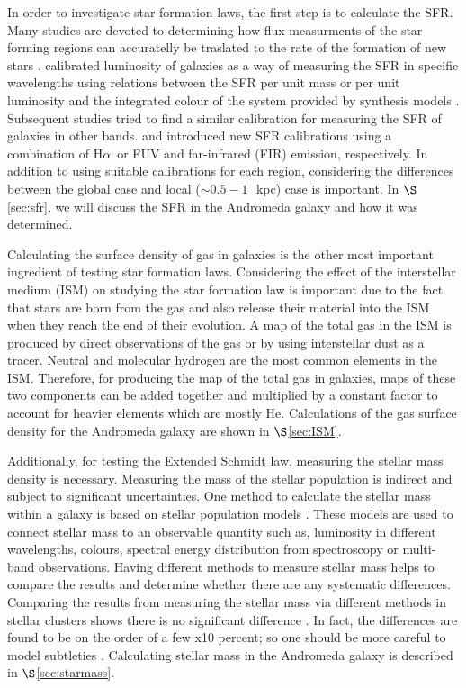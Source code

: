 \documentclass[useAMS,usenatbib]{mn2e}
\newcommand \kpc        {\,{\rm kpc}}
\newcommand \halpha    {H$\alpha $\ }
\begin{document}
In order to investigate star formation laws, the first step is to calculate the SFR. Many studies are devoted to determining how flux measurments of the star forming regions can accuratelly be traslated to the rate of the formation of new stars \citep[e.g.,][]{Kennicutt12, Calzetti13, Zhu08, Kennicutt09, Boquien10, Boquien11, Hao11}. \cite{Kennicutt98b} calibrated luminosity of galaxies as a way of measuring the SFR in specific wavelengths using relations between the SFR per unit mass or per unit luminosity and the integrated colour of the system provided by synthesis models \citep[e.g.,][]{Bruzual93}. Subsequent studies tried to find a similar calibration for measuring the SFR of galaxies in other bands. \cite{Kennicutt09} and \cite{Hao11} introduced new SFR calibrations using a combination of \halpha or FUV and far-infrared (FIR) emission, respectively. In addition to using suitable calibrations for each region, considering the differences between the global case and local ($\sim 0.5-1$~\kpc) case is important. In $\S$\ref{sec:sfr}, we will discuss the SFR in the Andromeda galaxy and how it was determined. %

Calculating the surface density of gas in galaxies is the other most important ingredient of testing star formation laws. Considering the effect of the interstellar medium (ISM) on studying the star formation law is important due to the fact that stars are born from the gas and also release their material into the ISM when they reach the end of their evolution. A map of the total gas in the ISM is produced by direct observations of the gas or by using interstellar dust as a tracer. Neutral and molecular hydrogen are the most common elements in the ISM. Therefore, for producing the map of the total gas in galaxies, maps of these two components can be added together and multiplied by a constant factor to account for heavier elements which are mostly He. Calculations of the gas surface density for the Andromeda galaxy are shown in $\S$\ref{sec:ISM}. %

Additionally, for testing the Extended Schmidt law, measuring the stellar mass density is necessary. Measuring the mass of the stellar population is indirect and subject to significant uncertainties. One method to calculate the stellar mass within a galaxy is based on stellar population models \citep[e.g.][]{ Bruzual93, Kotulla09}. These models are used to connect stellar mass to an observable quantity such as, luminosity in different wavelengths, colours, spectral energy distribution from spectroscopy or multi-band observations. Having different methods to measure stellar mass helps to compare the results and determine whether there are any systematic differences. Comparing the results from measuring the stellar mass via different methods in stellar clusters shows there is no significant difference \citep{Tamm12}. In fact, the differences are found to be on the order of a few x10 percent; so one should be more careful to model subtleties \citep{McLaughlin05}. Calculating stellar mass in the Andromeda galaxy is described in $\S$\ref{sec:starmass}. %
\end{document}
